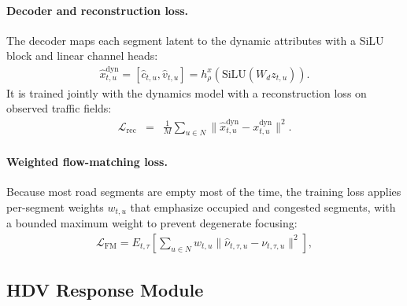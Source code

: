 \paragraph{Decoder and reconstruction loss.}  The decoder maps each segment
latent to the dynamic attributes with a SiLU block and linear channel heads:
\begin{equation}
\begin{array}{rcl}
\hat x^{\mathrm{dyn}}_{t,u}
=
[\hat c_{t,u},\hat v_{t,u}] =
h_\rho^x(\mathrm{SiLU}(W_d z_{t,u})).
\end{array}
\end{equation}
It is trained jointly with the dynamics model with a reconstruction loss on
observed traffic fields:
\begin{equation}
\begin{array}{rcl}
\mathcal{L}_{\mathrm{rec}}
&=&
\displaystyle
\frac{1}{M}\sum_{u\in N}
\|\hat x^{\mathrm{dyn}}_{t,u}-x^{\mathrm{dyn}}_{t,u}\|^2.
\end{array}
\end{equation}

\paragraph{Weighted flow-matching loss.}  Because most road segments are
empty most of the time, the training loss applies per-segment weights
\(w_{t,u}\) that emphasize occupied and congested segments, with a bounded
maximum weight to prevent degenerate focusing:
\begin{equation}
\begin{array}{l}
\mathcal{L}_{\mathrm{FM}}
=
{E}_{t,\tau}
\left[
\sum_{u\in N}w_{t,u}\|\hat\nu_{t,\tau,u}-\nu_{t,\tau,u}\|^2
\right],
\end{array}
\end{equation}

\subsection{HDV Response Module}

